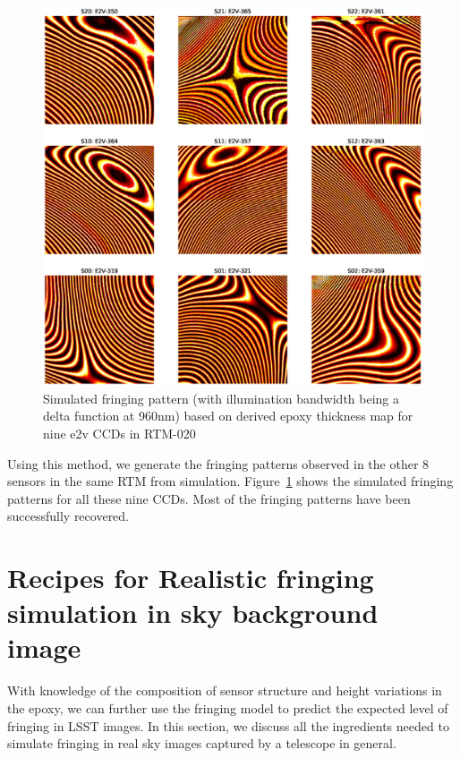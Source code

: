 \documentclass[twocolumn]{aastex63} %
\begin{document}
\begin{CJK*}{UTF8}{gbsn}
\begin{figure}[tbh]
\centering
\includegraphics[scale = 0.45]{RTM-020-Sim.eps}
\caption{Simulated fringing pattern (with illumination bandwidth being a delta function at 960nm) based on derived epoxy thickness map for nine e2v CCDs in RTM-020}
\label{fig:RTM-020-SIMS}
\end{figure}

Using this method, we generate the fringing patterns observed in the other 8 sensors in the same RTM from simulation. Figure~\ref{fig:RTM-020-SIMS} shows the simulated fringing patterns for all these nine CCDs. Most of the fringing patterns have been successfully recovered.

\section{Recipes for Realistic fringing simulation in sky background image} \label{sec:recipes for real image}
With knowledge of the composition of sensor structure and height variations in the epoxy, we can further use the fringing model to predict the expected level of fringing in LSST images. In this section, we discuss all the ingredients needed to simulate fringing in real sky images captured by a telescope in general.  


\end{CJK*}
\end{document}
